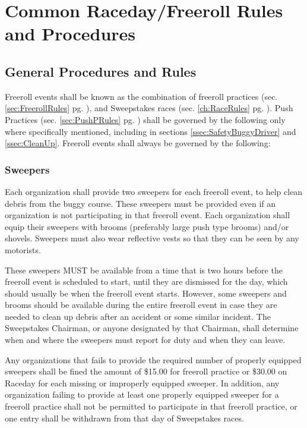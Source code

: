 \chapter{Common Raceday/Freeroll Rules and Procedures}
\label{ch:CommonRules}

\section{General Procedures and Rules}
	Freeroll events shall be known as the combination of freeroll practices 
	(sec. \ref{sec:FreerollRules} pg. \pageref{sec:FreerollRules}), and Sweepstakes races 
	(sec. \ref{ch:RaceRules} pg. \pageref{ch:RaceRules}). Push Practices 
	(sec. \ref{sec:PushPRules} pg. \pageref{sec:PushPRules}) shall 
	be governed by the following only where specifically mentioned, including 
	in sections \ref{ssec:SafetyBuggyDriver} and \ref{ssec:CleanUp}. Freeroll 
	events shall always be governed by the following:

\subsection{Sweepers}

	Each organization shall provide two sweepers for each freeroll event, to
	help clean debris from the buggy course. These sweepers must be provided even
	if an organization is not participating in that freeroll event. Each
	organization shall equip their sweepers with brooms (preferably large push type
	brooms) and/or shovels. Sweepers must also wear reflective vests so that they
	can be seen by any motorists.

	These sweepers MUST be available from a time that is two hours before the
	freeroll event is scheduled to start, until they are dismissed for the day,
	which should usually be when the freeroll event starts. However, some
	sweepers and brooms should be available during the entire freeroll event in
	case they are needed to clean up debris after an accident or some similar
	incident. The Sweepstakes Chairman, or anyone designated by that Chairman,
	shall determine when and where the sweepers must report for duty and when they
	can leave.

	Any organizations that fails to provide the required number of properly
	equipped sweepers shall be fined the amount of \$15.00 for freeroll practice or 
	\$30.00 on Raceday for each missing or improperly equipped sweeper. In addition, 
	any organization failing to provide at least one properly equipped sweeper for a
	freeroll practice shall not be permitted to participate in that freeroll practice,
	or one entry shall be withdrawn from that day of Sweepstakes races.

